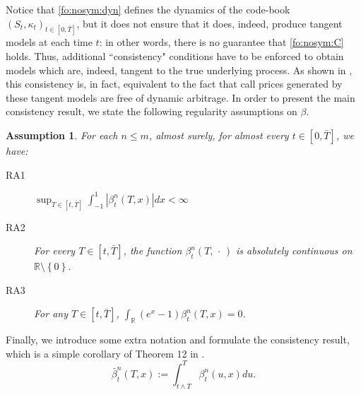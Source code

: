 \documentclass{article}
\numberwithin{equation}{section}
\newtheorem{ass}{Assumption}
\newcommand\RR {\mathbb R}
\def\bT{\bar{T}}
\def\bbeta{\bar{\beta}}
\begin{document}
Notice that \eqref{fo:nosym:dyn} defines the dynamics of the code-book $(S_t,\kappa_t)_{t\in[0,\bar{T}]}$, but it does not ensure that it does, indeed, produce tangent models at each time $t$: in other words, there is no guarantee that \eqref{fo:nosym:C} holds. Thus, additional ``consistency" conditions have to be enforced to obtain models which are, indeed, tangent to the true underlying process. As shown in \cite{carmona2010tangentlevy}, this consistency is, in fact, equivalent to the fact that call prices generated by these tangent models are free of dynamic arbitrage. In order to present the main consistency result, we state the following regularity assumptions on $\beta$.

\begin{ass}
For each $n\leq m$,
almost surely, for almost every $t\in[0,\bT]$, we have:

\begin{description}

\item[RA1] $\label{eq.betaAltAssumption} \sup_{T\in[t,\bT]}\int_{-1}^1 \left|\beta^n_t(T,x)\right|dx <\infty$

\item[RA2]  For every $T\in[t,\bT]$, the function $\beta^n_t(T,\,\cdot\,)$ is absolutely
continuous on $\RR\setminus\left\{0\right\}$.

\item[RA3] For any $T\in[t,\bT]$, $\int_{\RR}\left(e^x-1\right)\beta^n_t(T,x)=0$.

\end{description}

\end{ass}


Finally, we introduce some extra notation and formulate the consistency result, which is a simple corollary of Theorem 12 in \cite{carmona2010tangentlevy}.
\begin{equation}\label{eq.Psi.betabar}
\bbeta^n_t(T,x) :=\int_{t\wedge T}^T \beta_t^n(u,x) du.
\end{equation}
\end{document}
